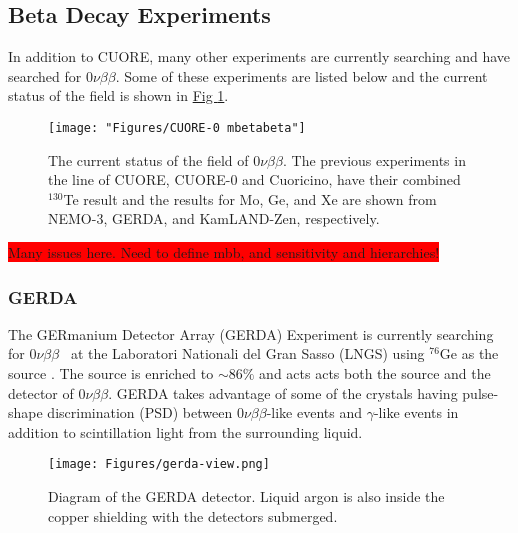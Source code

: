 \documentclass[12pt,a4paper]{article}
\newcommand{\zeronubb}{$0\nu \beta \beta$}
\begin{document}
\subsection{Beta Decay Experiments} \label{sec:zeronubb_Experiments}

In addition to CUORE, many other experiments are currently searching and have searched for \zeronubb. Some of these experiments are listed below and the current status of the field is shown in \hyperref[fig:cuore-0-mbetabeta]{Fig \ref*{fig:cuore-0-mbetabeta}}.


\begin{figure}[htbp]
\centering
\texttt{[image: "Figures/CUORE-0 mbetabeta"]}
\caption{The current status of the field of \zeronubb. The previous experiments in the line of CUORE, CUORE-0 and Cuoricino, have their combined $^{130}$Te result and the results for Mo, Ge, and Xe are shown from NEMO-3, GERDA, and KamLAND-Zen, respectively.}
\label{fig:cuore-0-mbetabeta}
\end{figure}

\colorbox{red}{Many issues here. Need to define mbb, and sensitivity and hierarchies!}

\subsubsection*{GERDA}

The GERmanium Detector Array (GERDA) Experiment is currently searching for \zeronubb~ at the Laboratori Nationali del Gran Sasso (LNGS) using $^{76}$Ge as the source \cite{Agostini:2016iid}. The source is enriched to $\sim86\%$ and acts acts both the source and the detector of \zeronubb. GERDA takes advantage of some of the crystals having pulse-shape discrimination (PSD) between \zeronubb-like events and $\gamma$-like events in addition to scintillation light from the surrounding liquid.

\begin{figure}[tbph]
\centering
\texttt{[image: Figures/gerda-view.png]}
\caption{Diagram of the GERDA detector. Liquid argon is also inside the copper shielding with the detectors submerged.}
\label{fig:gerda-labelled}
\end{figure}
\end{document}
